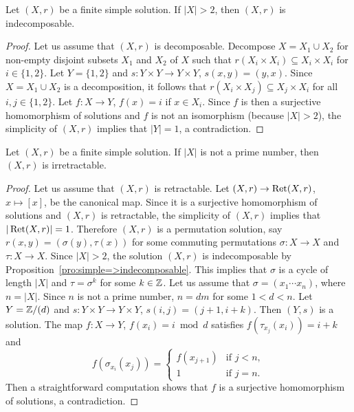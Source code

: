\begin{proposition}
\label{pro:simple=>indecomposable}
Let $(X,r)$ be a finite simple solution. 
If $|X|>2$, then $(X,r)$ is indecomposable. 
\end{proposition}

\begin{proof}
Let us assume that $(X,r)$ is decomposable. Decompose $X=X_1\cup X_2$ 
for non-empty disjoint subsets $X_1$ and $X_2$ of $X$ such 
that $r(X_i\times X_i)\subseteq X_i\times X_i$ for $i\in\{1,2\}$. 
Let $Y=\{1,2\}$ and $s\colon Y\times Y\to Y\times Y$, $s(x,y)=(y,x)$. 
Since $X=X_1\cup X_2$ is a decomposition, it follows that $r(X_i\times X_j)\subseteq X_j\times X_i$ for all $i,j\in\{1,2\}$. 
Let $f\colon X\to Y$, $f(x)=i$ if $x\in X_i$. 
Since $f$ is then a surjective homomorphism of solutions and $f$ is not an isomorphism (because $|X|>2$), the 
simplicity of $(X,r)$ implies that $|Y|=1$, a contradiction. 
\end{proof}

\begin{proposition}
Let $(X,r)$ be a finite simple  solution. 
If $|X|$ is not a prime number, then $(X,r)$ is irretractable.
\end{proposition}

\begin{proof}
Let us assume that $(X,r)$ is retractable. 
Let $(X,r)\to\operatorname{Ret}(X,r)$, $x\mapsto [x]$, be the canonical map. Since it is a surjective homomorphism of solutions
and $(X,r)$ is retractable, the simplicity of $(X,r)$ implies that $|\operatorname{Ret}(X,r)|=1$. Therefore $(X,r)$ is a permutation solution, say 
$r(x,y)=(\sigma(y),\tau(x))$ for some commuting permutations $\sigma\colon X\to X$
and $\tau\colon X\to X$. Since $|X|>2$, the solution $(X,r)$ 
is indecomposable by Proposition~\ref{pro:simple=>indecomposable}. This implies that $\sigma$ is a cycle of length $|X|$
and $\tau=\sigma^k$ for some $k\in\mathbb{Z}$. Let us assume that 
$\sigma=(x_1\cdots x_n)$, where $n=|X|$. 
Since $n$ is not a prime number, $n=dm$ for some $1<d<n$. Let $Y=\mathbb{Z}/(d)$ and
$s\colon Y\times Y\to Y\times Y$, $s(i,j)=(j+1,i+k)$. Then $(Y,s)$ is a solution. 
The map
$f\colon X\to Y$, $f(x_i)=i\bmod d$
satisfies $f(\tau_{x_j}(x_i))=i+k$ and 
\[
f(\sigma_{x_i}(x_j))
=\begin{cases}
f(x_{j+1}) & \text{if $j<n$},\\
1 & \text{if $j=n$}.
\end{cases}
\]
Then a straightforward computation shows that $f$ is a 
surjective homomorphism of solutions, a contradiction. 
\end{proof}

